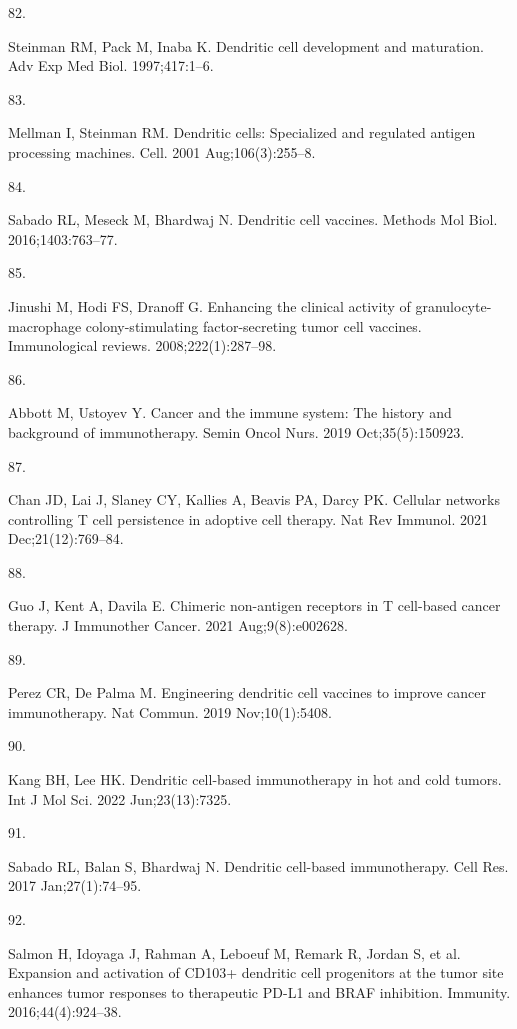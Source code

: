 \documentclass[
]{article}
\newlength{\cslhangindent}
\newlength{\csllabelwidth}
\newenvironment{CSLReferences}[2] %
 {\begin{list}{}{%
  \setlength{\itemindent}{0pt}
  \setlength{\leftmargin}{0pt}
  \setlength{\parsep}{0pt}
  \ifodd #1
   \setlength{\leftmargin}{\cslhangindent}
   \setlength{\itemindent}{-1\cslhangindent}
  \fi
  \setlength{\itemsep}{#2\baselineskip}}}
 {\end{list}}
\newcommand{\CSLLeftMargin}[1]{\parbox[t]{\csllabelwidth}{\strut#1\strut}}
\newcommand{\CSLRightInline}[1]{\parbox[t]{\linewidth - \csllabelwidth}{\strut#1\strut}}
\begin{document}
\begin{CSLReferences}{0}{1}
\CSLLeftMargin{82. }%
\CSLRightInline{Steinman RM, Pack M, Inaba K. Dendritic cell development
and maturation. Adv Exp Med Biol. 1997;417:1--6. }

\CSLLeftMargin{83. }%
\CSLRightInline{Mellman I, Steinman RM. Dendritic cells: Specialized and
regulated antigen processing machines. Cell. 2001 Aug;106(3):255--8. }

\CSLLeftMargin{84. }%
\CSLRightInline{Sabado RL, Meseck M, Bhardwaj N. Dendritic cell
vaccines. Methods Mol Biol. 2016;1403:763--77. }

\CSLLeftMargin{85. }%
\CSLRightInline{Jinushi M, Hodi FS, Dranoff G. Enhancing the clinical
activity of granulocyte-macrophage colony-stimulating factor-secreting
tumor cell vaccines. Immunological reviews. 2008;222(1):287--98. }

\CSLLeftMargin{86. }%
\CSLRightInline{Abbott M, Ustoyev Y. Cancer and the immune system: The
history and background of immunotherapy. Semin Oncol Nurs. 2019
Oct;35(5):150923. }

\CSLLeftMargin{87. }%
\CSLRightInline{Chan JD, Lai J, Slaney CY, Kallies A, Beavis PA, Darcy
PK. Cellular networks controlling {T} cell persistence in adoptive cell
therapy. Nat Rev Immunol. 2021 Dec;21(12):769--84. }

\CSLLeftMargin{88. }%
\CSLRightInline{Guo J, Kent A, Davila E. Chimeric non-antigen receptors
in {T} cell-based cancer therapy. J Immunother Cancer. 2021
Aug;9(8):e002628. }

\CSLLeftMargin{89. }%
\CSLRightInline{Perez CR, De Palma M. Engineering dendritic cell
vaccines to improve cancer immunotherapy. Nat Commun. 2019
Nov;10(1):5408. }

\CSLLeftMargin{90. }%
\CSLRightInline{Kang BH, Lee HK. Dendritic cell-based immunotherapy in
hot and cold tumors. Int J Mol Sci. 2022 Jun;23(13):7325. }

\CSLLeftMargin{91. }%
\CSLRightInline{Sabado RL, Balan S, Bhardwaj N. Dendritic cell-based
immunotherapy. Cell Res. 2017 Jan;27(1):74--95. }

\CSLLeftMargin{92. }%
\CSLRightInline{Salmon H, Idoyaga J, Rahman A, Leboeuf M, Remark R,
Jordan S, et al. Expansion and activation of CD103+ dendritic cell
progenitors at the tumor site enhances tumor responses to therapeutic
PD-L1 and BRAF inhibition. Immunity. 2016;44(4):924--38. }


\end{CSLReferences}
\end{document}
